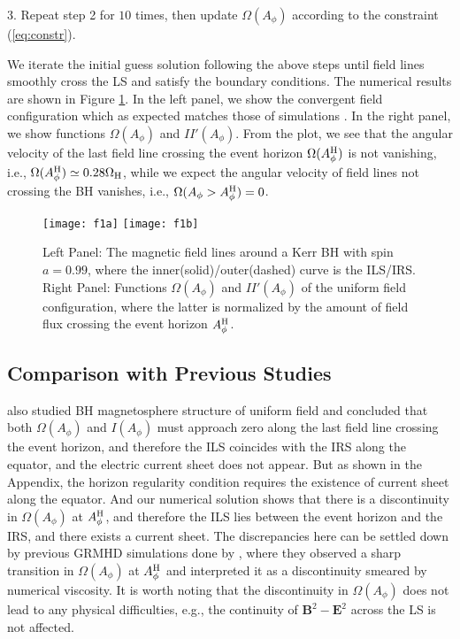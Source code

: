 \documentclass[iop,apj]{emulateapj}
\def\WH{\Omega_{\rm H}}
\def\AB{A_\phi^{\rm H}}
\begin{document}
3. Repeat step 2 for $10$ times, then update $\Omega(A_\phi)$ according to the constraint (\ref{eq:constr}).

We iterate the initial guess solution following the above steps until field lines smoothly
cross the LS and satisfy the boundary conditions.
The numerical results are shown in Figure \ref{fig:lines}.
In the left panel, we show the convergent field configuration
which as expected matches those of simulations \citep[e.g.][]{Komissarov2007}.
In the right panel, we show functions $\Omega(A_\phi)$ and $II'(A_\phi)$.
From the plot, we see that the angular velocity of the last field line crossing the event horizon
$\Omega(\AB)$ is not vanishing, i.e., $\Omega(\AB) \simeq 0.28\WH$,
while we expect the angular velocity of field lines not crossing the BH vanishes,
i.e., $\Omega(A_\phi > \AB) = 0$.


\begin{figure*}
    \centering
\texttt{[image: f1a]}%
\texttt{[image: f1b]}
\caption{Left Panel: The magnetic field lines around a Kerr BH with spin $a=0.99$,
where the inner(solid)/outer(dashed) curve is the ILS/IRS.
Right Panel: Functions $\Omega(A_\phi)$ and $II'(A_\phi)$ of the uniform field configuration,
where the latter is normalized by the amount of field flux crossing the event horizon $\AB$.}
\label{fig:lines}
\end{figure*}

\subsection{Comparison with Previous Studies}

\citet{Nathanail2014} also studied BH magnetosphere structure of uniform field and concluded that
both $\Omega(A_\phi)$ and $I(A_\phi)$ must approach zero along the last field line crossing the event horizon,
and therefore the ILS coincides with the IRS along the equator,
and the electric current sheet does not appear. But as shown in the Appendix, the horizon regularity condition
requires the existence of current sheet along the equator. And our numerical solution shows that there is
a discontinuity in $\Omega(A_\phi)$ at $\AB$, and therefore the ILS lies between the event horizon
and the IRS, and there exists a current sheet.
The discrepancies here can be settled down by previous GRMHD simulations done by \citet{Komissarov2005},
where they observed a sharp transition in $\Omega(A_\phi)$ at $\AB$ and interpreted it as a discontinuity
smeared by numerical viscosity. It is worth noting that the discontinuity in $\Omega(A_\phi)$ does not lead to
any physical difficulties, e.g., the continuity of $\bm B^2- \bm E^2$ across the LS is not affected.
\end{document}
